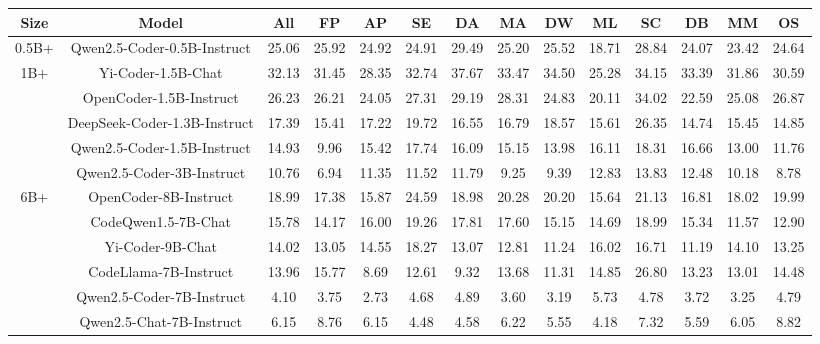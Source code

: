 \documentclass[11pt, a4paper, logo, copyright, nonumbering, amsart]{map}
\begin{document}
\begin{CJK*}{UTF8}{gbsn}
\begin{table*}[h!]
\begin{adjustbox}{width=\textwidth}
\begin{tabular}{c|c|cccccccccccc}
    \toprule
    \textbf{Size} & \textbf{Model} & \textbf{All} & \textbf{FP} & \textbf{AP} & \textbf{SE} & \textbf{DA} & \textbf{MA} & \textbf{DW} & \textbf{ML} & \textbf{SC} & \textbf{DB} & \textbf{MM} & \textbf{OS} \\
    
    \midrule
    0.5B+ & Qwen2.5-Coder-0.5B-Instruct & 25.06 & 25.92 & 24.92 & 24.91 & 29.49 & 25.20 & 25.52 & 18.71 & 28.84 & 24.07 & 23.42 & 24.64 \\
    
    \midrule
    \multirow{5}{*}{1B+} 
    & Yi-Coder-1.5B-Chat & 32.13 & 31.45 & 28.35 & 32.74 & 37.67 & 33.47 & 34.50 & 25.28 & 34.15 & 33.39 & 31.86 & 30.59 \\
    & OpenCoder-1.5B-Instruct & 26.23 & 26.21 & 24.05 & 27.31 & 29.19 & 28.31 & 24.83 & 20.11 & 34.02 & 22.59 & 25.08 & 26.87 \\
    & DeepSeek-Coder-1.3B-Instruct & 17.39 & 15.41 & 17.22 & 19.72 & 16.55 & 16.79 & 18.57 & 15.61 & 26.35 & 14.74 & 15.45 & 14.85 \\
    & Qwen2.5-Coder-1.5B-Instruct & 14.93 & 9.96 & 15.42 & 17.74 & 16.09 & 15.15 & 13.98 & 16.11 & 18.31 & 16.66 & 13.00 & 11.76 \\
    & Qwen2.5-Coder-3B-Instruct & 10.76 & 6.94 & 11.35 & 11.52 & 11.79 & 9.25 & 9.39 & 12.83 & 13.83 & 12.48 & 10.18 & 8.78 \\
    
    \midrule
    \multirow{6}{*}{6B+} 
    & OpenCoder-8B-Instruct & 18.99 & 17.38 & 15.87 & 24.59 & 18.98 & 20.28 & 20.20 & 15.64 & 21.13 & 16.81 & 18.02 & 19.99 \\
    & CodeQwen1.5-7B-Chat & 15.78 & 14.17 & 16.00 & 19.26 & 17.81 & 17.60 & 15.15 & 14.69 & 18.99 & 15.34 & 11.57 & 12.90 \\
    & Yi-Coder-9B-Chat & 14.02 & 13.05 & 14.55 & 18.27 & 13.07 & 12.81 & 11.24 & 16.02 & 16.71 & 11.19 & 14.10 & 13.25 \\
    & CodeLlama-7B-Instruct & 13.96 & 15.77 & 8.69 & 12.61 & 9.32 & 13.68 & 11.31 & 14.85 & 26.80 & 13.23 & 13.01 & 14.48 \\
    & Qwen2.5-Coder-7B-Instruct & 4.10 & 3.75 & 2.73 & 4.68 & 4.89 & 3.60 & 3.19 & 5.73 & 4.78 & 3.72 & 3.25 & 4.79 \\
    & Qwen2.5-Chat-7B-Instruct & 6.15 & 8.76 & 6.15 & 4.48 & 4.58 & 6.22 & 5.55 & 4.18 & 7.32 & 5.59 & 6.05 & 8.82 \\
    

\end{tabular}
\end{adjustbox}
\end{table*}
\end{CJK*}
\end{document}
